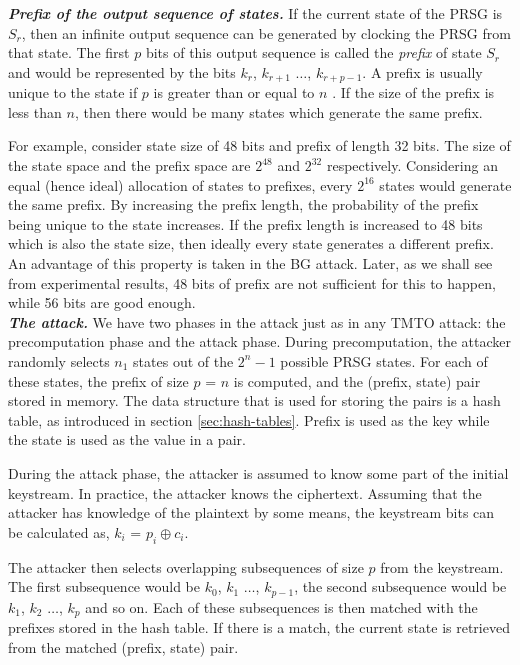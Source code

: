 \noindent \textit{\textbf{Prefix of the output sequence of states.}} If the current state of the PRSG is $S_r$, then an infinite output sequence can be generated by clocking the PRSG from that state. The first $p$ bits of this output sequence is called the \textit{prefix} of state $S_r$ and would be represented by the bits $k_r$, $k_{r+1}$ $\ldots$, $k_{r+p-1}$. A prefix is usually unique to the state if $p$ is greater than or equal to $n$ \cite{biryukov2000rtc}. If the size of the prefix is less than $n$, then there would be many states which generate the same prefix. 

For example, consider state size of 48 bits and prefix of length 32 bits. The size of the state space and the prefix space are $2^{48}$ and $2^{32}$ respectively. Considering an equal (hence ideal) allocation of states to prefixes, every $2^{16}$ states would generate the same prefix. By increasing the prefix length, the probability of the prefix being unique to the state increases. If the prefix length is increased to 48 bits which is also the state size, then ideally every state generates a different prefix. An advantage of this property is taken in the BG attack. Later, as we shall see from experimental results, 48 bits of prefix are not sufficient for this to happen, while 56 bits are good enough.\\

\noindent \textit{\textbf{The attack.}} We have two phases in the attack just as in any TMTO attack: the precomputation phase and the attack phase. During precomputation, the attacker randomly selects $n_1$ states out of the $2^n - 1$ possible PRSG states. For each of these states, the prefix of size $p$ = $n$ is computed, and the (prefix, state) pair stored in memory. The data structure that is used for storing the pairs is a hash table, as introduced in section \ref{sec:hash-tables}. Prefix is used as the key while the state is used as the value in a pair.

During the attack phase, the attacker is assumed to know some part of the initial keystream. In practice, the attacker knows the ciphertext. Assuming that the attacker has knowledge of the plaintext by some means, the keystream bits can be calculated as, $k_i$ = $p_i \oplus c_i$. 

The attacker then selects overlapping subsequences of size $p$ from the keystream. The first subsequence would be $k_0$, $k_1$ $\ldots$, $k_{p-1}$, the second subsequence would be $k_1$, $k_2$ $\ldots$, $k_{p}$ and so on. Each of these subsequences is then matched with the prefixes stored in the hash table. If there is a match, the current state is retrieved from the matched (prefix, state) pair.\\


